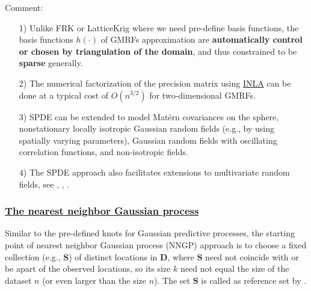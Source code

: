 \documentclass[
12pt, %
a4paper, %
oneside, %
headinclude,footinclude, %
BCOR5mm, %
]{scrartcl}
\begin{document}
\textcolor[rgb]{1.00,0.00,1.00}{Comment:}
\begin{itemize}
\item [1)]Unlike FRK or LatticeKrig where we need pre-define basis functions, the basis functions $h(\cdot)$ of GMRFs approximation are  \textbf{automatically control or chosen by triangulation of the domain}, and thus constrained to be \textbf{sparse} generally.
\item [2)]The numerical factorization of the precision matrix using \href{http://www.r-inla.org/}{INLA} can be done at a typical cost of $O(n^{3/2})$ for two-dimensional GMRFs.
\item [3)]SPDE can be extended to model Matérn covariances on the sphere, nonstationary locally isotropic Gaussian random fields (e.g., by
using spatially varying parameters), Gaussian random fields with oscillating correlation functions, and non-isotropic fields.
\item [4)]The SPDE approach also facilitates extensions to multivariate random fields, see \href{https://chenyw68.github.io/Literature/[2013] Multivariate Gaussian random fields using systems of stochastic partial differential equations.pdf}{\cite{hu2013multivariate}}, \href{https://chenyw68.github.io/Literature/[2016]Spatial modeling with system of stochastic partial differential equations.pdf}{\cite{hu2016spatial}}, \href{https://chenyw68.github.io/Literature/[2020]Multivariate type G Matern stochastic partial differential equation random fields.pdf}{\cite{bolin2020multivariate}}.
\end{itemize}

\subsubsection{\href{https://chenyw68.github.io/Literature[2020]spNNGP R package for Nearest Neighbor Gaussian Process models.pdf}{The nearest neighbor Gaussian process}}
Similar to the pre-defined knots for Gaussian predictive processes, the starting point of nearest neighbor Gaussian process (NNGP) approach is to choose a fixed collection (e.g.,  $\boldsymbol{S}$) of distinct locations in $\boldsymbol{D}$, where $\boldsymbol{S}$ need not coincide with or be apart of the
observed locations, so its size $k$ need not equal the size of the dataset $n$ (or \textcolor[rgb]{0.50,0.50,0.50}{even larger than the size $n$}). The set $\boldsymbol{S}$ is called as reference set by
\href{https://chenyw68.github.io/Literature/[2016]Hierarchical nearest-neighbor Gaussian process models for large geostatistical datasets.pdf}{\cite{datta2016hierarchical}}.
\end{document}
